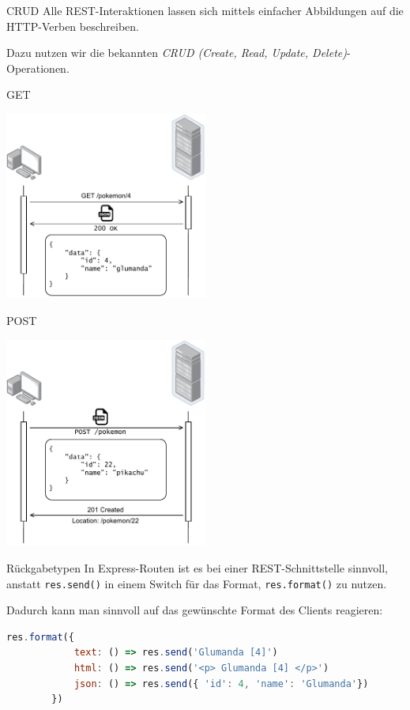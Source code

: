 \begin{defi}{CRUD}
    Alle REST-Interaktionen lassen sich mittels einfacher Abbildungen auf die HTTP-Verben beschreiben.

    Dazu nutzen wir die bekannten \emph{CRUD (Create, Read, Update, Delete)}-Operationen.
\end{defi}

\begin{example}{GET}
    \begin{center}
        \includegraphics[width=0.5\textwidth]{includes/figures/example_rest_get.pdf}
    \end{center}
\end{example}

\begin{example}{POST}
    \begin{center}
        \includegraphics[width=0.5\textwidth]{includes/figures/example_rest_post.pdf}
    \end{center}
\end{example}

\begin{bonus}{Rückgabetypen}
    In Express-Routen ist es bei einer REST-Schnittstelle sinnvoll, anstatt \texttt{res.send()} in einem Switch für das Format, \texttt{res.format()} zu nutzen.

    Dadurch kann man sinnvoll auf das gewünschte Format des Clients reagieren:

    \begin{lstlisting}[language=JavaScript]
        res.format({
            text: () => res.send('Glumanda [4]')
            html: () => res.send('<p> Glumanda [4] </p>')
            json: () => res.send({ 'id': 4, 'name': 'Glumanda'})
        })
    \end{lstlisting}
\end{bonus}

